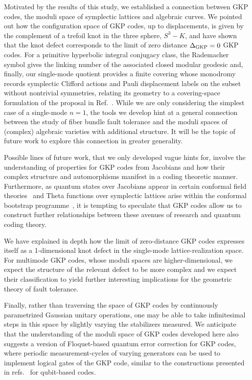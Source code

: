 \documentclass[a4paper, aps, pra, 11pt, onecolumn, tightenlines, superscriptaddress]{revtex4-2}
\begin{document}
Motivated by the results of this study, we established a connection between GKP codes, the moduli space of symplectic lattices and algebraic curves. We pointed out how the configuration space of GKP codes, up to displacements, is given by the complement of a trefoil knot in the three sphere, $S^3-K$, and have shown that the knot defect corresponds to the limit of zero distance $\Delta_{\rm GKP}=0$ GKP codes.  For a primitive hyperbolic integral conjugacy class, the Rademacher symbol gives the linking number of the associated closed modular geodesic and, finally, our single-mode quotient provides a finite covering whose monodromy records symplectic Clifford actions and Pauli displacement labels on the subset without nontrivial symmetries, relating its geometry to a covering-space formulation of the proposal in Ref.~\cite{gottesman2017fibre}.
While we are only considering the simplest case of a single-mode $n=1$, the tools we develop hint at a general connection between the study of fiber bundle fault tolerance and the moduli spaces of (complex) algebraic varieties with additional structure. 
It will be the topic of future work to explore this connection in greater generality. 

Possible lines of future work, that we only developed vague hints for, involve the understanding of properties for GKP codes from Jacobians and how their complex structure and automorphisms manifest in a coding theoretic manner. Furthermore, as quantum states over Jacobians appear in certain conformal field theories~\cite{WittenAxelrod91} and Theta functions over symplectic lattices arise within the conformal bootstrap programme~\cite{Dymarsky_2021}, it is tempting to speculate that GKP codes allow us to construct further relationships between these avenues of research and quantum coding theory.

We have explained in depth how the limit of zero-distance GKP codes expresses itself as a 1-dimensional knot defect in the single-mode lattice-realization space. 
For multimode GKP codes, whose moduli spaces are higher-dimensional, we expect the structure of the relevant defect to be more complex and we expect their classification to yield further interesting implications for the geometric theory of fault tolerance.

Finally, rather than traversing the space of GKP codes by continuously parametrized Gaussian unitary operations, one may be able to take infinitesimal steps in this space by slightly varying the stabilizers measured. 
We anticipate that the understanding of the moduli space of GKP codes developed here also suggests a version of Floquet-based quantum error correction for GKP codes, where periodic measurement-cycles of varying generators can be used to implement logical gates of the GKP code, similar to the constructions presented in refs.~\cite{Hastings_2021, Vuillot_2019_codedeformation, davydova2023quantum, Townsend_Teague_2023, Kesselring_2024} for qubit-based codes.
\end{document}
